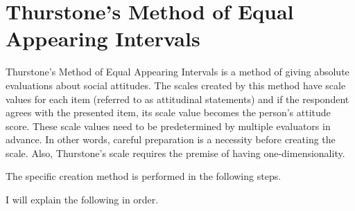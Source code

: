 \documentclass{ltjsbook}
\begin{document}
\section{Thurstone's Method of Equal Appearing Intervals}
\label{ThurstoneScale}
Thurstone's Method of Equal Appearing Intervals is a method of giving absolute evaluations about social attitudes. The scales created by this method have scale values for each item (referred to as attitudinal statements) and if the respondent agrees with the presented item, its scale value becomes the person's attitude score. These scale values need to be predetermined by multiple evaluators in advance. In other words, careful preparation is a necessity before creating the scale. Also, Thurstone's scale requires the premise of having one-dimensionality.

The specific creation method is performed in the following steps.


I will explain the following in order.
\end{document}
